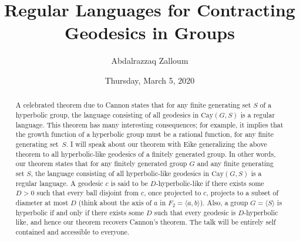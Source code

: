 \documentclass{UAmathtalk}
\author{Abdalrazzaq Zalloum}
\title{Regular Languages for Contracting Geodesics in Groups}
\date{Thursday, March 5, 2020}
\begin{document}
\maketitle

\begin{abstract}
A celebrated theorem due to Cannon states that for any finite generating set $S$ of a hyperbolic group, the language consisting of all geodesics in $\textrm{Cay}(G,S)$ is a regular language. This theorem has many interesting consequences; for example, it implies that the growth function of a hyperbolic group must be a rational function, for any finite generating set~$S$. I will speak about our theorem with Eike generalizing the above theorem to all hyperbolic-like geodesics of a finitely generated group. In other words, our theorem states that for any finitely generated group $G$ and any finite generating set $S$, the language consisting of all hyperbolic-like geodesics in $\textrm{Cay}(G,S)$ is a regular language. A geodesic $c$ is said to be $D$-hyperbolic-like if there exists some $D>0$ such that every ball disjoint from $c$, once projected to $c$, projects to a subset of diameter at most $D$ (think about the axis of $a$ in $F_2=\langle a,b\rangle$). Also, a group $G=\langle S\rangle$ is hyperbolic if and only if there exists some $D$ such that every geodesic is $D$-hyperbolic like, and hence our theorem recovers Cannon's theorem. The talk will be entirely self contained and accessible to everyone.
\end{abstract}
\end{document}

